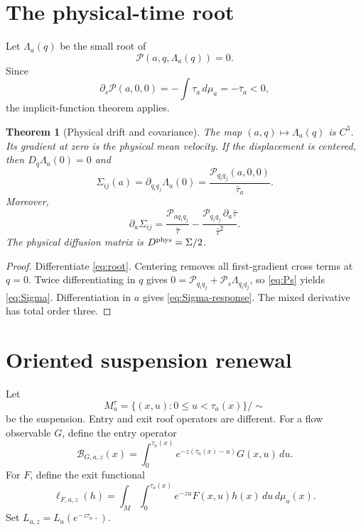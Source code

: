 \documentclass[11pt,reqno]{amsart}
\newtheorem{theorem}{Theorem}[section]
\theoremstyle{definition}
\theoremstyle{remark}
\begin{document}
\section{The physical-time root}\label{sec:root}

Let $\Lambda_a(q)$ be the small root of
\begin{equation}\label{eq:root}
 \mathscr P(a,q,\Lambda_a(q))=0.
\end{equation}
Since
\begin{equation}\label{eq:Ps}
 \partial_s\mathscr P(a,0,0)
 =-\int\tau_a\,d\mu_a=-\bar\tau_a<0,
\end{equation}
the implicit-function theorem applies.

\begin{theorem}[Physical drift and covariance]\label{thm:physical}
The map $(a,q)\mapsto\Lambda_a(q)$ is $C^3$.  Its gradient at zero is the
physical mean velocity.  If the displacement is centered, then
$D_q\Lambda_a(0)=0$ and
\begin{equation}\label{eq:Sigma}
 \Sigma_{ij}(a)
 =\partial_{q_iq_j}\Lambda_a(0)
 =\frac{\mathscr P_{q_iq_j}(a,0,0)}{\bar\tau_a}.
\end{equation}
Moreover,
\begin{equation}\label{eq:Sigma-response}
 \partial_a\Sigma_{ij}
 =\frac{\mathscr P_{aq_iq_j}}{\bar\tau}
 -\frac{\mathscr P_{q_iq_j}\,\partial_a\bar\tau}
       {\bar\tau^2}.
\end{equation}
The physical diffusion matrix is $D^{\rm phys}=\Sigma/2$.
\end{theorem}

\begin{proof}
Differentiate \eqref{eq:root}.  Centering removes all first-gradient cross
terms at $q=0$.  Twice differentiating in $q$ gives
$0=\mathscr P_{q_iq_j}+\mathscr P_s\Lambda_{q_iq_j}$, so
\eqref{eq:Ps} yields \eqref{eq:Sigma}.  Differentiation in $a$ gives
\eqref{eq:Sigma-response}.  The mixed derivative has total order three.
\end{proof}

\section{Oriented suspension renewal}\label{sec:renewal}

Let
\[
 M_a^\tau=\{(x,u):0\le u<\tau_a(x)\}/\sim
\]
be the suspension.  Entry and exit roof operators are different.  For a flow
observable $G$, define the entry operator
\begin{equation}\label{eq:entry}
 \mathcal B_{G,a,z}(x)
 =\int_0^{\tau_a(x)}e^{-z(\tau_a(x)-u)}G(x,u)\,du.
\end{equation}
For $F$, define the exit functional
\begin{equation}\label{eq:exit}
 \ell_{F,a,z}(h)
 =\int_M\int_0^{\tau_a(x)}e^{-zu}F(x,u)h(x)\,du\,d\mu_a(x).
\end{equation}
Set $L_{a,z}=L_a(e^{-z\tau_a}\cdot)$.
\end{document}
